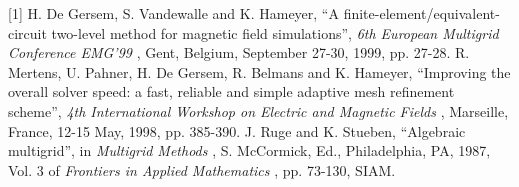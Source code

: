 \documentclass[11pt]{article}
\begin{document}
[1] H. De Gersem, S. Vandewalle and K. Hameyer, ``A finite-element/equivalent-circuit two-level method for magnetic field simulations'',
{\em 
6th European Multigrid Conference EMG'99
}
, Gent, Belgium, September 27-30, 1999, pp. 27-28.
 \newline 
[2] R. Mertens, U. Pahner, H. De Gersem, R. Belmans and K. Hameyer, ``Improving the overall solver speed: a fast, reliable and simple adaptive mesh refinement scheme'',
{\em 
4th International Workshop on Electric and Magnetic Fields
}
, Marseille, France, 12-15 May, 1998, pp. 385-390.
 \newline 
[3] J. Ruge and K. Stueben, ``Algebraic multigrid'', in
{\em 
Multigrid Methods
}
, S. McCormick, Ed., Philadelphia, PA, 1987, Vol. 3 of
{\em 
Frontiers in Applied Mathematics
}
, pp. 73-130, SIAM.
 \newline 
\end{document}
